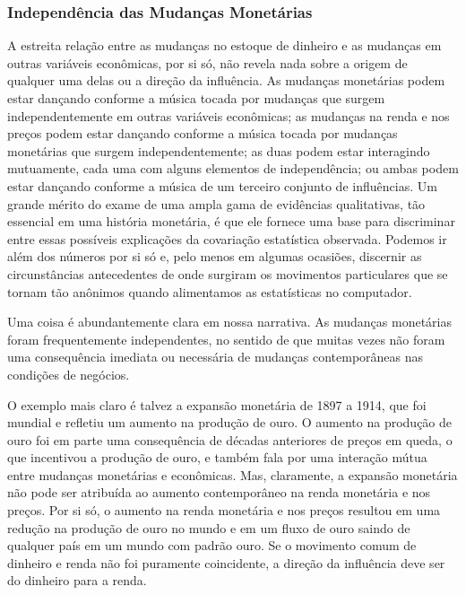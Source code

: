 \documentclass[12pt]{article}
\begin{document}
 \subsubsection{\textbf{Independência das Mudanças Monetárias}}

A estreita relação entre as mudanças no estoque de dinheiro e as mudanças em outras variáveis econômicas, por si só, não revela nada sobre a origem de qualquer uma delas ou a direção da influência. As mudanças monetárias podem estar dançando conforme a música tocada por mudanças que surgem independentemente em outras variáveis econômicas; as mudanças na renda e nos preços podem estar dançando conforme a música tocada por mudanças monetárias que surgem independentemente; as duas podem estar interagindo mutuamente, cada uma com alguns elementos de independência; ou ambas podem estar dançando conforme a música de um terceiro conjunto de influências. Um grande mérito do exame de uma ampla gama de evidências qualitativas, tão essencial em uma história monetária, é que ele fornece uma base para discriminar entre essas possíveis explicações da covariação estatística observada. Podemos ir além dos números por si só e, pelo menos em algumas ocasiões, discernir as circunstâncias antecedentes de onde surgiram os movimentos particulares que se tornam tão anônimos quando alimentamos as estatísticas no computador.

Uma coisa é abundantemente clara em nossa narrativa. As mudanças monetárias foram frequentemente independentes, no sentido de que muitas vezes não foram uma consequência imediata ou necessária de mudanças contemporâneas nas condições de negócios.

O exemplo mais claro é talvez a expansão monetária de 1897 a 1914, que foi mundial e refletiu um aumento na produção de ouro. O aumento na produção de ouro foi em parte uma consequência de décadas anteriores de preços em queda, o que incentivou a produção de ouro, e também fala por uma interação mútua entre mudanças monetárias e econômicas. Mas, claramente, a expansão monetária não pode ser atribuída ao aumento contemporâneo na renda monetária e nos preços. Por si só, o aumento na renda monetária e nos preços resultou em uma redução na produção de ouro no mundo e em um fluxo de ouro saindo de qualquer país em um mundo com padrão ouro. Se o movimento comum de dinheiro e renda não foi puramente coincidente, a direção da influência deve ser do dinheiro para a renda.
\end{document}
